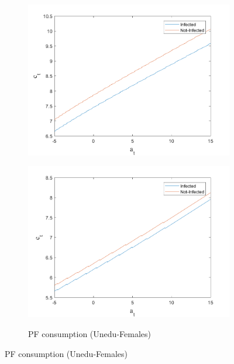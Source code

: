 \begin{figure}[H]
\begin{subfigure}{0.5\textwidth}
   \includegraphics[width=\linewidth,height = 0.22\textheight]{figures/mio/FIG8.png}
    \label{fig_dert}
\end{subfigure}
\hspace*{\fill}
\begin{subfigure}{0.5\textwidth}\caption{PF consumption (Unedu-Females)}
   \includegraphics[width=\linewidth,height = 0.22\textheight]{figures/mio/FIG7.png}
    \label{fig:x_b}
\end{subfigure}
\hspace*{\fill}
\end{figure}

